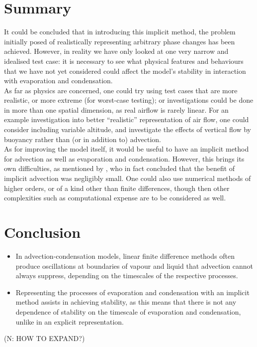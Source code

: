 \documentclass[11pt]{article}
\begin{document}
\section{Summary}
It could be concluded that in introducing this implicit method, the problem initially posed of realistically representing arbitrary phase changes has been achieved. However, in reality we have only looked at one very narrow and idealised test case: it is necessary to see what physical features and behaviours that we have not yet considered could affect the model's stability in interaction with evaporation and condensation. \\
As far as physics are concerned, one could try using test cases that are more realistic, or more extreme (for worst-case testing); or investigations could be done in more than one spatial dimension, as real airflow is rarely linear. For an example investigation into better ``realistic'' representation of air flow, one could consider including variable altitude, and investigate the effects of vertical flow by buoyancy rather than (or in addition to) advection. \\
As for improving the model itself, it would be useful to have an implicit method for advection as well as evaporation and condensation. However, this brings its own difficulties, as mentioned by \citet{GS1990}, who in fact concluded that the benefit of implicit advection was negligibly small. One could also use numerical methods of higher orders, or of a kind other than finite differences, though then other complexities such as computational expense are to be considered as well.

\section{Conclusion}
\begin{itemize}
\item In advection-condensation models, linear finite difference methods often produce oscillations at boundaries of vapour and liquid that advection cannot always suppress, depending on the timescales of the respective processes.
\item Representing the processes of evaporation and condensation with an implicit method assists in achieving stability, as this means that there is not any dependence of stability on the timescale of evaporation and condensation, unlike in an explicit representation.
\end{itemize}
(N: HOW TO EXPAND?)

\newpage


\end{document}
